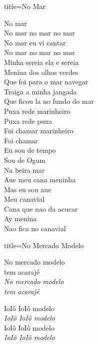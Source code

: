 \documentclass[fontsize=14pt, paper=a4, twoside, DIV=20]{scrreprt} %
\begin{document}
\begin{multicols*}{2}
\begin{song}{title={No Mar}}
        \begin{verse*}
            No mar\\
            No mar no mar no mar\\
            No mar eu vi cantar\\
            No mar no mar no mar\\
            Minha sereia ela e sereia\\
            Menina dos olhos verdes\\
            Que foi para o mar navegar\\
            Traiga a minha jangada\\
            Que ficou la no fundo do mar\\
            Puxa rede marinheiro\\
            Puxa rede puxa\\
            Foi chamar marinheiro\\
            Foi chamar\\
            Eu sou de tempo\\
            Sou de Ogum\\
            Na beira mar\\
            Aue meu cana meninha\\
            Mas eu sou aue\\
            Meu canavial\\
            Cana que nao da acucar\\
            Ay menina\\
            Nao fica no canavial\\
        \end{verse*}
\end{song}

\begin{song}{title={No Mercado Modelo}}
    \begin{verse*}
            No mercado modelo \\
            tem acarajé\\
            \textit{No mercado modelo \\
            tem acarajé\\}

            IoIô IoIô modelo \\
            \textit{IoIô IoIô modelo \\}
            IoIô IoIô modelo \\
            \textit{IoIô IoIô modelo \\}
    \end{verse*}
\end{song}


\end{multicols*}
\end{document}
